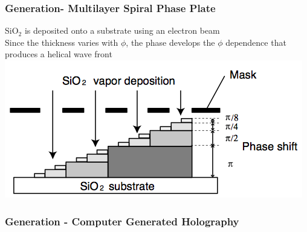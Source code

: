 \documentclass[]{beamer}
\title{}
\author{Paho Lurie-Gregg}
\date{}
\begin{document}
\begin{frame}
	\frametitle{Generation-  Multilayer Spiral Phase Plate}
	SiO$_2$ is deposited onto a substrate using an electron beam
	\\Since the thickness varies with $\phi$, the phase develops the $\phi$ dependence that produces a helical wave front
	\\\centering
	\includegraphics[scale=.3]{MSPP.jpg}
\end{frame}

\begin{frame}
	\frametitle{Generation - Computer Generated Holography}
	\centering
	
\end{frame}


\end{document}

